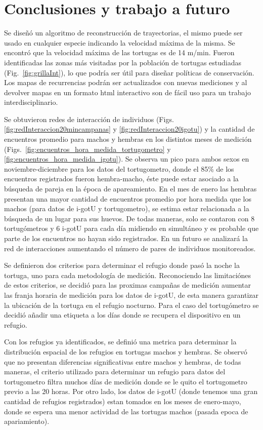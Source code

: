 \chapter{Conclusiones y trabajo a futuro}

Se diseñó un algoritmo de reconstrucción de trayectorias, el mismo puede ser usado en cualquier especie indicando la velocidad máxima de la misma. Se encontró que la velocidad máxima de las tortugas es de 14 m/min. Fueron identificadas las zonas más visitadas por la población de tortugas estudiadas (Fig.~\ref{fig:grillaInt}), lo que podría ser útil para diseñar políticas de conservación. Los mapas de recurrencias podrán ser actualizados con nuevas mediciones y al devolver mapas en un formato html interactivo son de fácil uso para un trabajo interdisciplinario.

Se obtuvieron redes  de interacción de individuos (Figs. \ref{fig:redInteraccion20mincampanas} y \ref{fig:redInteraccion20igotu}) y la cantidad de encuentros promedio para machos y hembras en los distintos meses de medición (Figs.~\ref{fig:encuentros_hora_medida_tortugometro} y \ref{fig:encuentros_hora_medida_igotu}). Se observa un pico para ambos sexos en noviembre-diciembre para los datos del tortugometro, donde el 85\% de los encuentros registrados fueron hembra-macho, éste puede estar asociado a la búsqueda de pareja en la época de apareamiento. En el mes de enero las hembras presentan una mayor cantidad de encuentros promedio por hora medida que los machos (para datos de i-gotU y tortugometro), se estima estar relacionada a la búsqueda de un lugar para sus huevos. De todas maneras, solo se contaron con 8 tortugómetros y 6 i-gotU  para cada día midiendo en simultáneo y es probable que parte de los encuentros no hayan sido registrados. En un futuro se analizará la red de interacciones aumentando el número de pares de individuos monitoreados.


Se definieron dos criterios para determinar el refugio donde pasó la noche la tortuga, uno para cada metodología de medición. Reconociendo las limitaciónes de estos criterios, se decidió para las proximas campañas de medición aumentar las franja horaria de medición para los datos de i-gotU, de esta manera garantizar la ubicación de la tortuga en el refugio nocturno. Para el caso del tortugómetro se decidió añadir una etiqueta a los días donde se recupera el dispositivo en un refugio.

Con los refugios ya identificados, se definió una metrica para determinar la distribución espacial de los refugios en tortugas machos y hembras. Se observó que no presentan diferencias significativas entre machos y hembras, de todas maneras, el criterio utilizado para determinar un refugio para datos del tortugometro filtra muchos días de medición donde se le quito el tortugometro previo a las 20 horas. Por otro lado, los datos de i-gotU (donde tenemos una gran cantidad de refugios registrados) estan tomados en los meses de enero-mayo, donde se espera una menor actividad de las tortugas machos (pasada epoca de apariamiento)\cite{Erika}.

